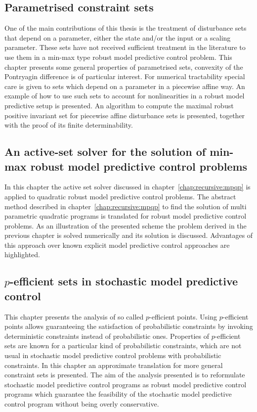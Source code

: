 \documentclass[a4paper,12pt]{scrartcl}
\begin{document}
\subsection{Parametrised constraint sets}\label{chap:mrpi:sets}
One of the main contributions of this thesis is the treatment of disturbance sets that depend on a parameter,
either the state and/or the input or a scaling parameter.
%
These sets have not received sufficient treatment in the literature to use them in a min-max type robust
model predictive control problem.
%
This chapter presents some general properties of parametrised sets, convexity of the Pontryagin difference
is of particular interest.
%
For numerical tractability special care is given to sets which depend on a parameter in a piecewise affine way.
%
An example of how to use such sets to account for nonlinearities in a robust model predictive setup is presented.
%
An algorithm to compute the maximal robust positive invariant set for piecewise affine disturbance sets is presented,
together with the proof of its finite determinability.

\subsection{An active-set solver for the solution of min-max robust model predictive control problems}
In this chapter the active set solver discussed in chapter~\ref{chap:recursive:mpqp} is applied to quadratic
robust model predictive control problems.
%
The abstract method described in chapter~\ref{chap:recursive:mpqp} to find the solution of multi parametric quadratic
programs is translated for robust model predictive control problems.
%
As an illustration of the presented scheme the problem derived in the previous chapter is solved numerically and its solution
is discussed.
%
Advantages of this approach over known explicit model predictive control approaches are highlighted.

\subsection{$p$-efficient sets in stochastic model predictive control}
This chapter presents the analysis of so called $p$-efficient points.
%
Using $p$-efficient points allows guaranteeing the satisfaction of probabilistic constraints by invoking deterministic
constraints instead of probabilistic ones.
%
Properties of $p$-efficient sets are known for a particular kind of probabilistic constraints, which are not usual
in stochastic model predictive control problems with probabilistic constraints.
%
In this chapter an approximate translation for more general constraint sets is presented.
%
The aim of the analysis presented is to reformulate stochastic model predictive control programs as robust model predictive
control programs which guarantee the feasibility of the stochastic model predictive control program without being overly
conservative.
\end{document}
